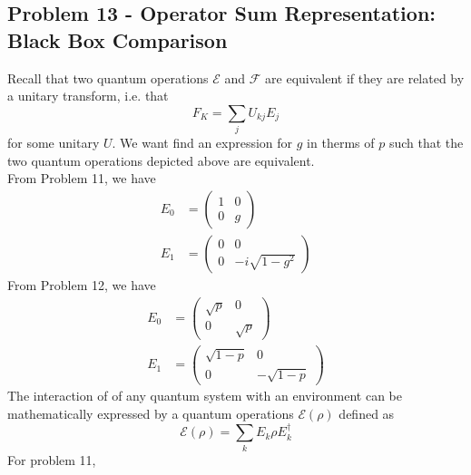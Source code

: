 \subsection{Problem 13 - Operator Sum Representation: Black Box Comparison}
Recall that two quantum operations $\mathcal{E}$ and $\mathcal{F}$ are equivalent if they are related by a unitary transform, i.e. that
\begin{equation}
    F_K = \sum_j U_{kj}E_j
\end{equation}
for some unitary $U$. We want find an expression for $g$ in therms of $p$ such that the two quantum operations depicted above are equivalent. \\
From Problem 11, we have
\begin{align}
    E_0 &= \begin{pmatrix}1 & 0 \\ 0 & g\end{pmatrix} \\
    E_1 &= \begin{pmatrix}0 & 0 \\ 0 & -i\sqrt{1-g^2}\end{pmatrix}
\end{align}
From Problem 12, we have
\begin{align}
    E_0 &= \begin{pmatrix}\sqrt{p} & 0 \\ 0 & \sqrt{p} \end{pmatrix}\\ 
    E_1 &= \begin{pmatrix}\sqrt{1-p} & 0 \\ 0 & -\sqrt{1-p} \end{pmatrix}
\end{align}
The interaction of of any quantum system with an environment can be mathematically expressed by a quantum operations $\mathcal{E}(\rho)$ defined as 
\begin{equation}
    \mathcal{E}(\rho) = \sum_k E_k \rho E_k^\dagger
\end{equation}
For problem 11, 
